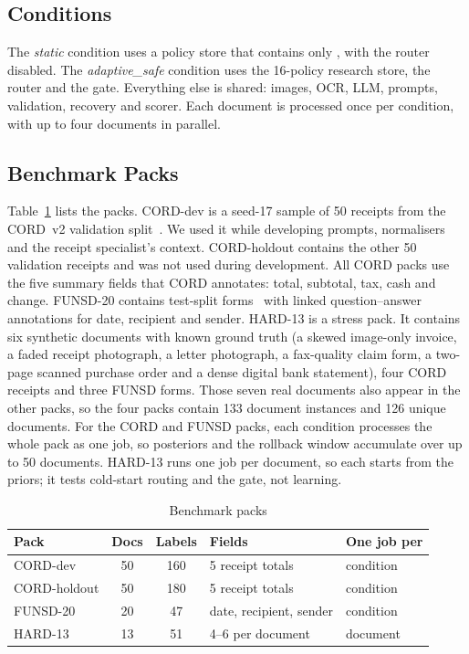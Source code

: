 \documentclass[conference,a4paper]{IEEEtran}
\newcommand{\pol}[1]{\texttt{\detokenize{#1}}}
\begin{document}
\subsection{Conditions}
The \emph{static} condition uses a policy store that contains only \pol{default}, with the router disabled. The \emph{adaptive\_safe} condition uses the 16-policy research store, the router and the gate. Everything else is shared: images, OCR, LLM, prompts, validation, recovery and scorer. Each document is processed once per condition, with up to four documents in parallel.

\subsection{Benchmark Packs}
Table~\ref{tab:packs} lists the packs. CORD-dev is a seed-17 sample of 50 receipts from the CORD~v2 validation split~\cite{cord}. We used it while developing prompts, normalisers and the receipt specialist's context. CORD-holdout contains the other 50 validation receipts and was not used during development. All CORD packs use the five summary fields that CORD annotates: total, subtotal, tax, cash and change. FUNSD-20 contains test-split forms~\cite{funsd} with linked question--answer annotations for date, recipient and sender. HARD-13 is a stress pack. It contains six synthetic documents with known ground truth (a skewed image-only invoice, a faded receipt photograph, a letter photograph, a fax-quality claim form, a two-page scanned purchase order and a dense digital bank statement), four CORD receipts and three FUNSD forms. Those seven real documents also appear in the other packs, so the four packs contain 133 document instances and 126 unique documents. For the CORD and FUNSD packs, each condition processes the whole pack as one job, so posteriors and the rollback window accumulate over up to 50 documents. HARD-13 runs one job per document, so each starts from the priors; it tests cold-start routing and the gate, not learning.

\begin{table}[t]
\caption{Benchmark packs}
\label{tab:packs}
\centering
\footnotesize
\setlength{\tabcolsep}{3pt}
\begin{tabular}{lccll}
\toprule
Pack & Docs & Labels & Fields & One job per\\
\midrule
CORD-dev & 50 & 160 & 5 receipt totals & condition\\
CORD-holdout & 50 & 180 & 5 receipt totals & condition\\
FUNSD-20 & 20 & 47 & date, recipient, sender & condition\\
HARD-13 & 13 & 51 & 4--6 per document & document\\
\bottomrule
\end{tabular}
\end{table}
\end{document}
